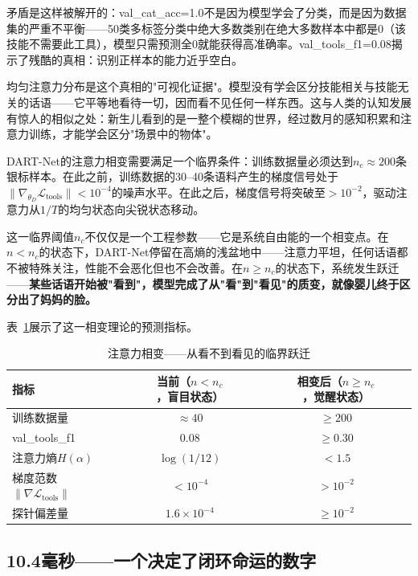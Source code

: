 \documentclass[twocolumn,10.5pt]{ctexart}
\def\cL{\mathcal{L}}
\begin{document}
矛盾是这样被解开的：val\_cat\_acc=1.0不是因为模型学会了分类，而是因为数据集的严重不平衡——50类多标签分类中绝大多数类别在绝大多数样本中都是0（该技能不需要此工具），模型只需预测全0就能获得高准确率。val\_tools\_f1=0.08揭示了残酷的真相：识别正样本的能力近乎空白。

均匀注意力分布是这个真相的"可视化证据"。模型没有学会区分技能相关与技能无关的话语——它平等地看待一切，因而看不见任何一样东西。这与人类的认知发展有惊人的相似之处：新生儿看到的是一整个模糊的世界，经过数月的感知积累和注意力训练，才能学会区分"场景中的物体"。

DART-Net的注意力相变需要满足一个临界条件：训练数据量必须达到$n_c \approx 200$条银标样本。在此之前，训练数据的30--40条语料产生的梯度信号处于$\|\nabla_{\theta_D} \cL_{\text{tools}}\| < 10^{-4}$的噪声水平。在此之后，梯度信号将突破至$>10^{-2}$，驱动注意力从$1/T$的均匀状态向尖锐状态移动。

这一临界阈值$n_c$不仅仅是一个工程参数——它是系统自由能的一个相变点。在$n < n_c$的状态下，DART-Net停留在高熵的浅盆地中——注意力平坦，任何话语都不被特殊关注，性能不会恶化但也不会改善。在$n \geq n_c$的状态下，系统发生跃迁——\textbf{某些话语开始被"看到"，模型完成了从"看"到"看见"的质变，就像婴儿终于区分出了妈妈的脸。}

表~\ref{tab:phase_passionate}展示了这一相变理论的预测指标。

\begin{table}[t]
\centering
\caption{注意力相变——从看不到看见的临界跃迁}
\label{tab:phase_passionate}
\setlength{\tabcolsep}{2pt}
\renewcommand{\arraystretch}{1.15}
\begin{tabular}{lcc}
\toprule
指标 & 当前（$n < n_c$，盲目状态） & 相变后（$n \geq n_c$，觉醒状态） \\
\midrule
训练数据量 & $\approx 40$ & $\geq 200$ \\
val\_tools\_f1 & 0.08 & $\geq 0.30$ \\
注意力熵$H(\alpha)$ & $\log(1/12)$ & $< 1.5$ \\
梯度范数$\|\nabla \cL_{\text{tools}}\|$ & $< 10^{-4}$ & $> 10^{-2}$ \\
探针偏差量 & $1.6\times 10^{-4}$ & $\geq 10^{-2}$ \\
\bottomrule
\end{tabular}
\end{table}

\subsection{10.4毫秒——一个决定了闭环命运的数字}
\end{document}
